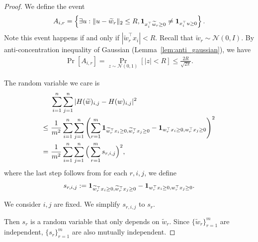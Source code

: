 \documentclass[11pt]{article}
\newcommand{\N}{\mathcal{N}}
\newcommand{\wt}{\widetilde}
\begin{document}
\begin{proof}

We define the event
\begin{align*}
A_{i,r} = \left\{ \exists u : \| u - \wt{w}_r \|_2 \leq R, {\bf 1}_{ x_i^\top \wt{w}_r \geq 0 } \neq {\bf 1}_{ x_i^\top u \geq 0 } \right\}.
\end{align*}
Note this event happens if and only if $| \wt{w}_r^\top x_i | < R$. Recall that $\wt{w}_r \sim \N(0,I)$. By anti-concentration inequality of Gaussian (Lemma~\ref{lem:anti_gaussian}), we have
\begin{align}\label{eq:Air_bound}
\Pr[ A_{i,r} ] = \Pr_{ z \sim \N(0,1) } [ | z | < R ] \leq \frac{ 2 R }{ \sqrt{2\pi} }.
\end{align}


The random variable we care is
{%
\begin{align*}
& ~ \sum_{i=1}^n \sum_{j=1}^n | H(\wt{w})_{i,j} - H(w)_{i,j} |^2 \\
\leq & ~ \frac{1}{m^2} \sum_{i=1}^n \sum_{j=1}^n \left( \sum_{r=1}^m {\bf 1}_{ \wt{w}_r^\top x_i \geq 0, \wt{w}_r^\top x_j \geq 0} - {\bf 1}_{ w_r^\top x_i \geq 0 , w_r^\top x_j \geq 0 } \right)^2 \\
= & ~ \frac{1}{m^2} \sum_{i=1}^n \sum_{j=1}^n  \Big( \sum_{r=1}^m s_{r,i,j} \Big)^2 ,
\end{align*}
}
where the last step follows from for each $r,i,j$, we define
\begin{align*}
s_{r,i,j} :=  {\bf 1}_{ \wt{w}_r^\top x_i \geq 0, \wt{w}_r^\top x_j \geq 0} - {\bf 1}_{ w_r^\top x_i \geq 0 , w_r^\top x_j \geq 0 } .
\end{align*} 

We consider $i,j$ are fixed. We simplify $s_{r,i,j}$ to $s_r$.

Then $s_r$ is a random variable that only depends on $\wt{w}_r$.
Since $\{\wt{w}_r\}_{r=1}^m$ are independent,
$\{s_r\}_{r=1}^m$ are also mutually independent.


\end{proof}
\end{document}
